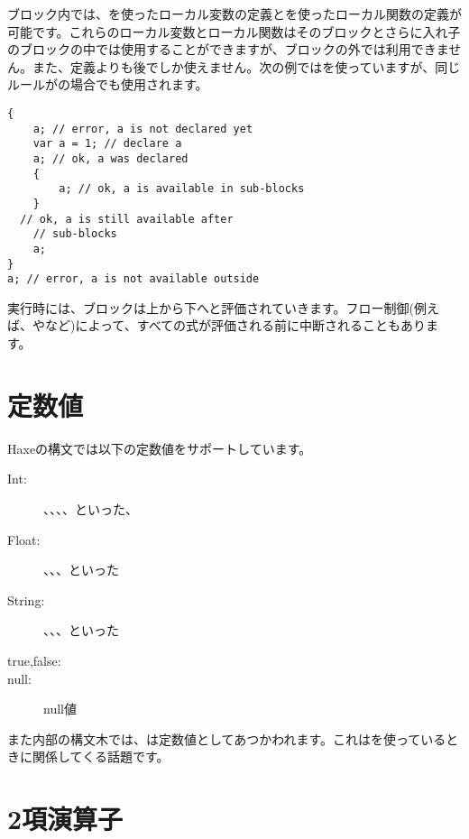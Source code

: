 ブロック内では、を使ったローカル変数の定義とを使ったローカル関数の定義が可能です。これらのローカル変数とローカル関数はそのブロックとさらに入れ子のブロックの中では使用することができますが、ブロックの外では利用できません。また、定義よりも後でしか使えません。次の例ではを使っていますが、同じルールがの場合でも使用されます。

\begin{lstlisting}
{
	a; // error, a is not declared yet
	var a = 1; // declare a
	a; // ok, a was declared
	{
		a; // ok, a is available in sub-blocks
	}
  // ok, a is still available after
	// sub-blocks	
	a;
}
a; // error, a is not available outside
\end{lstlisting}

実行時には、ブロックは上から下へと評価されていきます。フロー制御(例えば、やなど)によって、すべての式が評価される前に中断されることもあります。

\section{定数値}
\label{expression-constants}

Haxeの構文では以下の定数値をサポートしています。

\begin{description}
	\item[Int:] 、、、、といった、
	\item[Float:] 、、、といった
	\item[String:] 、、、といった
	\item[true,false:] 
	\item[null:] null値
\end{description}

また内部の構文木では、は定数値としてあつかわれます。これはを使っているときに関係してくる話題です。

\section{2項演算子}
\label{expression-binops}

